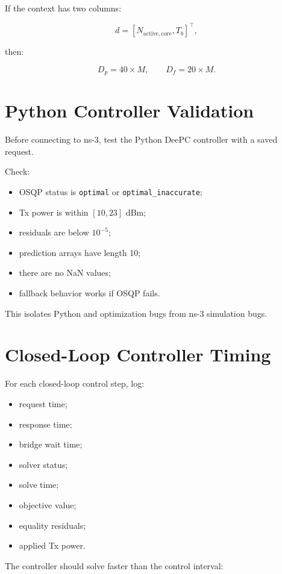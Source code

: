\documentclass[11pt]{article}
\begin{document}
If the context has two columns:

\[
d = [N_{\mathrm{active,core}},T_b]^\top,
\]

then:

\[
D_p = 40 \times M,\qquad D_f = 20 \times M.
\]

\section{Python Controller Validation}

Before connecting to ns-3, test the Python DeePC controller with a saved request.

Check:

\begin{itemize}
    \item OSQP status is \texttt{optimal} or \texttt{optimal\_inaccurate};
    \item Tx power is within $[10,23]$ dBm;
    \item residuals are below $10^{-5}$;
    \item prediction arrays have length 10;
    \item there are no NaN values;
    \item fallback behavior works if OSQP fails.
\end{itemize}

This isolates Python and optimization bugs from ns-3 simulation bugs.

\section{Closed-Loop Controller Timing}

For each closed-loop control step, log:

\begin{itemize}
    \item request time;
    \item response time;
    \item bridge wait time;
    \item solver status;
    \item solve time;
    \item objective value;
    \item equality residuals;
    \item applied Tx power.
\end{itemize}

The controller should solve faster than the control interval:
\end{document}
